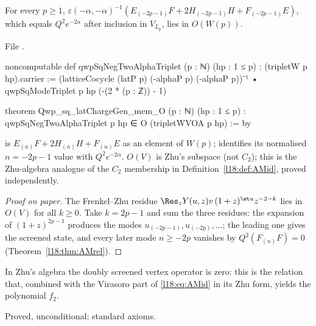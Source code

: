 \begin{theorem}\label{l18:thm:zhuscreen}
For every $p\ge1$, $\varepsilon(-\alpha,-\alpha)^{-1}(E_{(-2p-1)}F+2H_{(-2p-1)}H+F_{(-2p-1)}E)$, which equals
$Q^2e^{-2\alpha}$ after inclusion in $V_{L_p}$, lies in $O(W(p))$.
\end{theorem}
\noindent File .
\begin{leancode}
noncomputable def qwpSqNegTwoAlphaTriplet (p : ℕ) (hp : 1 ≤ p) :
    (tripletW p hp).carrier :=
  (latticeCocycle (latP p) (-alphaP p) (-alphaP p))⁻¹ •
    qwpSqModeTriplet p hp (-(2 * (p : ℤ)) - 1)

theorem Qwp_sq_latChargeGen_mem_O (p : ℕ) (hp : 1 ≤ p) :
    qwpSqNegTwoAlphaTriplet p hp ∈ O (tripletWVOA p hp) := by
\end{leancode}
\begin{dictionary}
 is $E_{(n)}F+2H_{(n)}H+F_{(n)}E$ as an element of $W(p)$;
 identifies its normalised $n=-2p-1$ value with $Q^2e^{-2\alpha}$. $O(V)$ is
Zhu's subspace (not $C_2$); this is the Zhu-algebra analogue of the $C_2$ membership in
Definition~\ref{l18:def:AMid}, proved independently.
\end{dictionary}
\begin{proof}[Proof on paper]
The Frenkel--Zhu residue $\Res_zY(u,z)v\,(1+z)^{\wt u}z^{-2-k}$ lies in $O(V)$ for all $k\ge0$. Take $k=2p-1$ and
sum the three residues: the expansion of $(1+z)^{2p-1}$ produces the modes $u_{(-2p-1)},u_{(-2p)},\dots$; the
leading one gives the screened state, and every later mode $n\ge-2p$ vanishes by
$Q^2(F_{(n)}F)=0$ (Theorem~\ref{l18:thm:AMrel}).
\end{proof}
\begin{physics}
In Zhu's algebra the doubly screened vertex operator is zero: this is the relation that, combined with
the Virasoro part of \eqref{l18:eq:AMid} in its Zhu form, yields the polynomial $f_2$.
\end{physics}
\begin{status}
Proved, unconditional; standard axioms.
\end{status}

